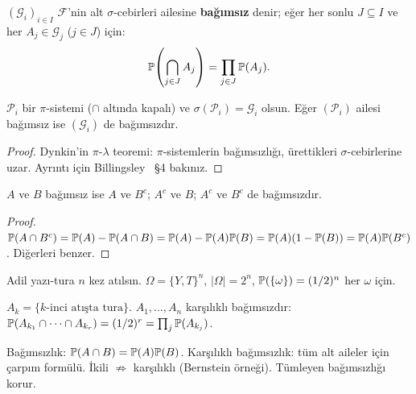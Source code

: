 \begin{tanim}\label{def:sigmababag}
$(\mathcal{G}_i)_{i \in I}$ $\mathcal{F}$'nin alt $\sigma$-cebirleri ailesine
\textbf{bağımsız} denir; eğer her sonlu $J \subseteq I$ ve her
$A_j \in \mathcal{G}_j$ ($j \in J$) için:
\[
  \mathbb{P}\!\left(\bigcap_{j \in J} A_j\right) = \prod_{j \in J} \mathbb{P}(A_j).
\]
\end{tanim}

\begin{onerme}\label{prop:pisys_bag}
$\mathcal{P}_i$ bir $\pi$-sistemi ($\cap$ altında kapalı) ve
$\sigma(\mathcal{P}_i) = \mathcal{G}_i$ olsun. Eğer $(\mathcal{P}_i)$ ailesi
bağımsız ise $(\mathcal{G}_i)$ de bağımsızdır.
\end{onerme}

\begin{proof}
Dynkin'in $\pi$-$\lambda$ teoremi: $\pi$-sistemlerin bağımsızlığı,
ürettikleri $\sigma$-cebirlerine uzar.
Ayrıntı için Billingsley~\cite{billingsley1995} §4 bakınız.
\end{proof}

\begin{onerme}\label{prop:bag_korunma}
$A$ ve $B$ bağımsız ise $A$ ve $B^c$; $A^c$ ve $B$; $A^c$ ve $B^c$ de bağımsızdır.
\end{onerme}

\begin{proof}
$\mathbb{P}(A \cap B^c) = \mathbb{P}(A) - \mathbb{P}(A \cap B) = \mathbb{P}(A) - \mathbb{P}(A)\mathbb{P}(B)
= \mathbb{P}(A)(1 - \mathbb{P}(B)) = \mathbb{P}(A)\mathbb{P}(B^c)$.
Diğerleri benzer.
\end{proof}

\begin{ornek}\label{ex:bag_deneme}
Adil yazı-tura $n$ kez atılsın. $\Omega = \{Y,T\}^n$, $|\Omega|=2^n$,
$\mathbb{P}(\{\omega\}) = (1/2)^n$ her $\omega$ için.

$A_k = \{k\text{-inci atışta tura}\}$. $A_1, \ldots, A_n$ karşılıklı bağımsızdır:
$\mathbb{P}(A_{k_1} \cap \cdots \cap A_{k_r}) = (1/2)^r = \prod_j \mathbb{P}(A_{k_j})$.
\end{ornek}

\begin{mikroozet}[§2.5 özeti]
Bağımsızlık: $\mathbb{P}(A \cap B) = \mathbb{P}(A)\mathbb{P}(B)$.
Karşılıklı bağımsızlık: tüm alt aileler için çarpım formülü.
İkili $\not\Rightarrow$ karşılıklı (Bernstein örneği).
Tümleyen bağımsızlığı korur.
\end{mikroozet}


